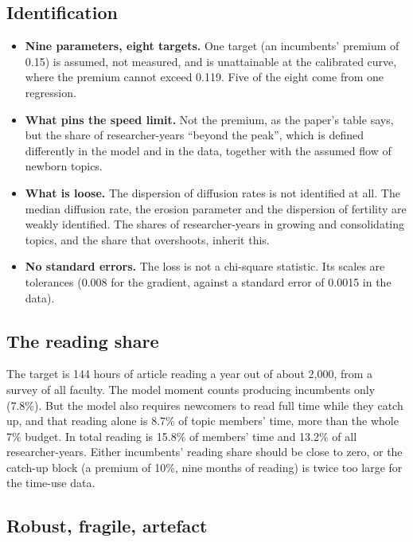 \subsection{Identification}

\begin{itemize}
\item \textbf{Nine parameters, eight targets.} One target (an incumbents' premium of 0.15) is assumed, not measured, and is unattainable at the calibrated curve, where the premium cannot exceed 0.119. Five of the eight come from one regression.
\item \textbf{What pins the speed limit.} Not the premium, as the paper's table says, but the share of researcher-years ``beyond the peak'', which is defined differently in the model and in the data, together with the assumed flow of newborn topics.
\item \textbf{What is loose.} The dispersion of diffusion rates is not identified at all. The median diffusion rate, the erosion parameter and the dispersion of fertility are weakly identified. The shares of researcher-years in growing and consolidating topics, and the share that overshoots, inherit this.
\item \textbf{No standard errors.} The loss is not a chi-square statistic. Its scales are tolerances (0.008 for the gradient, against a standard error of 0.0015 in the data).
\end{itemize}

\subsection{The reading share}

The target is 144 hours of article reading a year out of about 2,000, from a survey of all faculty. The model moment counts producing incumbents only (7.8\%). But the model also requires newcomers to read full time while they catch up, and that reading alone is 8.7\% of topic members' time, more than the whole 7\% budget. In total reading is 15.8\% of members' time and 13.2\% of all researcher-years. Either incumbents' reading share should be close to zero, or the catch-up block (a premium of 10\%, nine months of reading) is twice too large for the time-use data.

\subsection{Robust, fragile, artefact}

